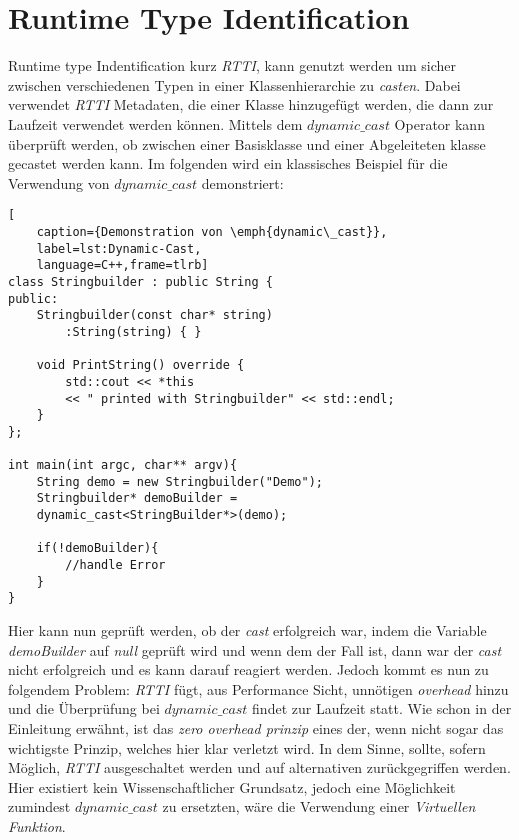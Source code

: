 \section{Runtime Type Identification}
Runtime type Indentification kurz \emph{RTTI}, kann genutzt werden um sicher zwischen
verschiedenen Typen in einer Klassenhierarchie zu \emph{casten}. Dabei verwendet \emph{RTTI}
Metadaten, die einer Klasse hinzugefügt werden, die dann zur Laufzeit verwendet werden können.
Mittels dem \emph{$dynamic\_cast$} Operator kann überprüft werden, ob zwischen einer Basisklasse
und einer Abgeleiteten klasse gecastet werden kann. Im folgenden wird ein klassisches Beispiel
für die Verwendung von \emph{$dynamic\_cast$} demonstriert:
\begin{lstlisting}[
    caption={Demonstration von \emph{dynamic\_cast}},
    label=lst:Dynamic-Cast,
    language=C++,frame=tlrb]
class Stringbuilder : public String {
public:
	Stringbuilder(const char* string)
		:String(string) { }

    void PrintString() override {
    	std::cout << *this
       	<< " printed with Stringbuilder" << std::endl;
    }
};

int main(int argc, char** argv){
	String demo = new Stringbuilder("Demo");
	Stringbuilder* demoBuilder =
	dynamic_cast<StringBuilder*>(demo);

	if(!demoBuilder){
		//handle Error
	}
}
\end{lstlisting}

Hier kann nun geprüft werden, ob der \emph{cast} erfolgreich war, indem die Variable
\emph{demoBuilder} auf \emph{null} geprüft wird und wenn dem der Fall ist, dann war der
\emph{cast} nicht erfolgreich und es kann darauf reagiert werden.
\newline
\newline
Jedoch kommt es nun zu folgendem Problem: \emph{RTTI} fügt, aus Performance Sicht, unnötigen
\emph{overhead} hinzu und die Überprüfung bei \emph{$dynamic\_cast$} findet zur Laufzeit statt.
Wie schon in der Einleitung erwähnt, ist das \emph{zero overhead prinzip} eines der, wenn nicht
sogar das wichtigste Prinzip, welches hier klar verletzt wird. In dem Sinne, sollte, sofern
Möglich, \emph{RTTI} ausgeschaltet werden und auf alternativen zurückgegriffen werden. Hier
existiert kein Wissenschaftlicher Grundsatz, jedoch eine Möglichkeit zumindest
\emph{$dynamic\_cast$} zu ersetzten, wäre die Verwendung einer \emph{Virtuellen Funktion}.